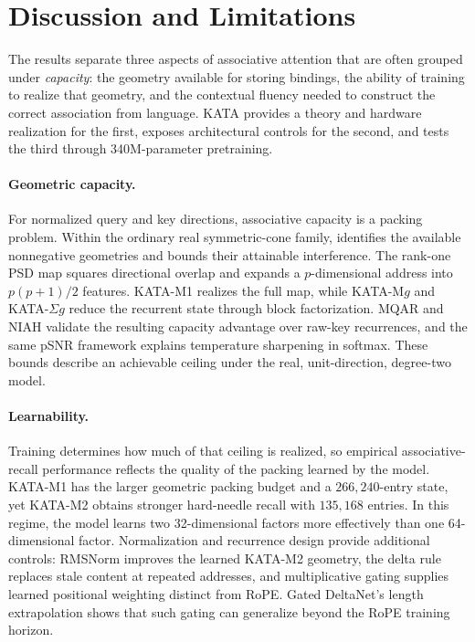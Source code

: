 \documentclass{article}
\newcommand{\1}{\bm{1}}
\theoremstyle{definition}
\begin{document}
\section{Discussion and Limitations} \label{sec:discussion}
The results separate three aspects of associative attention that are often grouped under
\emph{capacity}: the geometry available for storing bindings, the ability of training to realize that
geometry, and the contextual fluency needed to construct the correct association from language.
KATA provides a theory and hardware realization for the first, exposes architectural controls for
the second, and tests the third through 340M-parameter pretraining.

\paragraph{Geometric capacity.}
For normalized query and key directions, associative capacity is a packing problem. Within the
ordinary real symmetric-cone family,  identifies the available
nonnegative geometries and bounds their attainable interference. The rank-one PSD map squares
directional overlap and expands a $p$-dimensional address into $p(p+1)/2$ features. KATA-M1 realizes
the full map, while KATA-M$g$ and KATA-$\Sigma g$ reduce the recurrent state through block
factorization. MQAR and NIAH validate the resulting capacity advantage over raw-key recurrences, and
the same pSNR framework explains temperature sharpening in softmax. These bounds describe an
achievable ceiling under the real, unit-direction, degree-two model.

\paragraph{Learnability.}
Training determines how much of that ceiling is realized, so empirical associative-recall performance reflects the quality of the packing learned by the model. KATA-M1 has the larger geometric packing budget
and a $266{,}240$-entry state, yet KATA-M2 obtains stronger hard-needle recall with $135{,}168$
entries. In this regime, the model learns two 32-dimensional factors more effectively than one
64-dimensional factor. Normalization and recurrence design provide additional controls: RMSNorm
improves the learned KATA-M2 geometry, the delta rule replaces stale content at repeated addresses,
and multiplicative gating supplies learned positional weighting distinct from RoPE. Gated DeltaNet's
length extrapolation shows that such gating can generalize beyond the RoPE training horizon.
\end{document}
